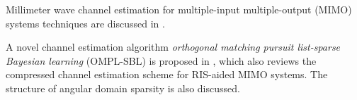 Millimeter wave channel estimation for multiple-input multiple-output (MIMO) systems
techniques are discussed in \cite{lee2016channel}.

A novel channel estimation algorithm
\textit{orthogonal matching pursuit list-sparse Bayesian learning} (OMPL-SBL)
is proposed in \cite{zhao2023ompl},
which also reviews the compressed channel estimation scheme for RIS-aided MIMO systems.
The structure of angular domain sparsity is also discussed.
